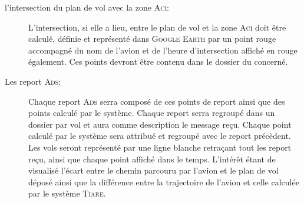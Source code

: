 \begin{description}
    \item[l'intersection du plan de vol avec la zone \textsc{Aci}:] L'intersection, si elle a lieu, entre le plan de vol et la zone \textsc{Aci} doit être calculé, définie et représenté dans \textsc{Google Earth} par un point rouge accompagné du nom de l'avion et de l'heure d'intersection affiché en rouge également. Ces points devront être contenu dans le dossier du concerné.

    \item[Les report \textsc{Ads}:] Chaque report \textsc{Ads} serra composé de ces points de report ainsi que des points calculé par le système. Chaque report serra regroupé dans un dossier par vol et aura comme description le message reçu. Chaque point calculé par le système sera attribué et regroupé avec le report précèdent. Les vols seront représenté par une ligne blanche retraçant tout les report reçu, ainsi que chaque point affiché dans le temps. L'intérêt étant de visualisé l'écart entre le chemin parcouru par l'avion et le plan de vol déposé ainsi que la différence entre la trajectoire de l'avion et celle calculée par le système \textsc{Tiare}. 
\end{description}

















